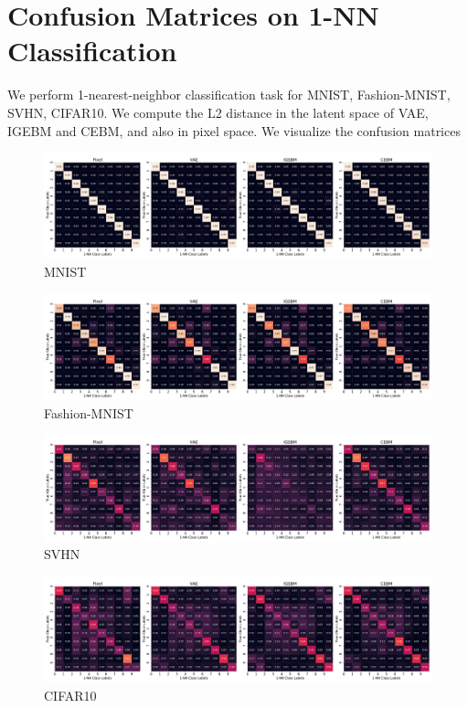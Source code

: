 \documentclass[tablecaption=bottom,wcp]{jmlr} %
\begin{document}
\section{Confusion Matrices on 1-NN Classification}
\label{appendix-sec:confuion matrices}
We perform 1-nearest-neighbor classification task for MNIST, Fashion-MNIST, SVHN, CIFAR10. We compute the L2 distance in the latent space of VAE, IGEBM and CEBM, and also in pixel space. We visualize the confusion matrices
\begin{figure}[!h]
\centering
\includegraphics[width=\linewidth]{figures/confusion_matrix_14row_mnist.pdf}
\caption{MNIST}
\label{appendix:confusion-matrices-mnist}
\end{figure}
\begin{figure}[!h]
\centering
\includegraphics[width=\linewidth]{figures/confusion_matrix_14row_fashionmnist.pdf}
\caption{Fashion-MNIST}
\label{appendix:confusion-matrices-fmnist}
\end{figure}
\vspace{-2em}
\begin{figure}[!h]
\centering
\includegraphics[width=\linewidth]{figures/confusion_matrix_14row_svhn.pdf}
\caption{SVHN}
\label{appendix:confusion-matrices-svhn}
\end{figure}
\vspace{-2em}
\begin{figure}[!h]
\centering
\includegraphics[width=\linewidth]{figures/confusion_matrix_14row_cifar10.pdf}
\caption{CIFAR10}
\label{appendix:confusion-matrices-cifar10}
\end{figure}
\end{document}
